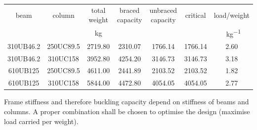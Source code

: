 \begin{solution}
\begin{table}[H]
\begin{tabular}{ccccccc}
	\toprule
	  beam    &  column   &  total weight  & braced capacity & unbraced capacity & critical &      load/weight      \\
	          &           & \si{\kilogram} &    \si{\kn}     &     \si{\kn}      & \si{\kn} & \si{\kn\per\kilogram} \\ \midrule
	310UB46.2 & 250UC89.5 &    2719.80     &     2310.07     &      1766.14      & 1766.14  &         2.60          \\
	310UB46.2 & 310UC158  &    3952.80     &     4254.20     &      3146.73      & 3146.73  &         3.18          \\
	610UB125  & 250UC89.5 &    4611.00     &     2441.89     &      2103.52      & 2103.52  &         1.82          \\
	610UB125  & 310UC158  &    5844.00     &     4472.80     &      4054.05      & 4054.05  &         2.77          \\ \bottomrule
\end{tabular}
\end{table}

Frame stiffness and therefore buckling capacity depend on stiffness of beams and columns.
A proper combination shall be chosen to optimise the design (maximise load carried per weight).
\end{solution}
